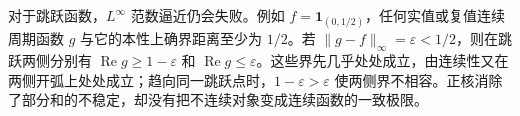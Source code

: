 对于跳跃函数，\(L^\infty\) 范数逼近仍会失败。例如 \(f=\mathbf1_{(0,1/2)}\)，任何实值或复值连续周期函数 \(g\) 与它的本性上确界距离至少为 \(1/2\)。若 \(\|g-f\|_\infty=\varepsilon<1/2\)，则在跳跃两侧分别有 \(\operatorname{Re}g\geq1-\varepsilon\) 和 \(\operatorname{Re}g\leq\varepsilon\)。这些界先几乎处处成立，由连续性又在两侧开弧上处处成立；趋向同一跳跃点时，\(1-\varepsilon>\varepsilon\) 使两侧界不相容。正核消除了部分和的不稳定，却没有把不连续对象变成连续函数的一致极限。
